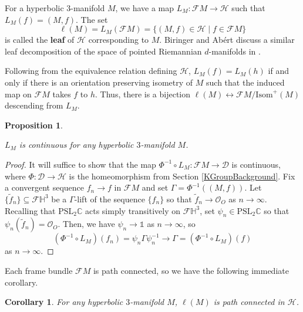 \documentclass[11pt,leqno]{article}
\newtheorem{prop}[lemma]{Proposition}
\newtheorem{cor}[lemma]{Corollary}
\theoremstyle{introdef}
\numberwithin{lemma}{section}
\theoremstyle{definition}
\newcommand{\C}{\mathbb{C}}
\begin{document}
For a hyperbolic $3$-manifold $M$, we have a map $L_M:\mathcal{F}M\rightarrow\mathcal{H}$ such that $L_M(f)=(M,f)$. The set \[\ell(M)=L_M(\mathcal{F}M)=\{(M,f)\in\mathcal{H}\;|\;f\in\mathcal{F}M\}\] is called the \textbf{leaf} of $\mathcal{H}$ corresponding to $M$. Biringer and Ab\'{e}rt discuss a similar leaf decomposition of the space of pointed Riemannian $d$-manifolds in \cite{IAN}. \par

Following from the equivalence relation defining $\mathcal{H}$, $L_M(f)=L_M(h)$ if and only if there is an orientation preserving isometry of $M$ such that the induced map on $\mathcal{F}M$ takes $f$ to $h$. Thus, there is a bijection $\ell(M)\leftrightarrow \mathcal{F}M/\mathrm{Isom}^+(M)$ descending from $L_M$.\par


\begin{prop}
\label{pathprop}

    $L_M$ is continuous for any hyperbolic $3$-manifold $M$.
    
\end{prop}



\begin{proof}
    It will suffice to show that the map $\Phi^{-1}\circ L_M:\mathcal{F}M\rightarrow\mathcal{D}$ is continuous, where $\Phi:\mathcal{D}\rightarrow\mathcal{H}$ is the homeomorphism from Section \ref{KGroupBackground}. Fix a convergent sequence $f_n\rightarrow f$ in $\mathcal{F}M$ and set $\Gamma=\Phi^{-1}((M,f))$. Let $\{\tilde{f}_n\}\subseteq\mathcal{F}\mathbb{H}^3$ be a $\Gamma$-lift of the sequence $\{f_n\}$ so that $\tilde{f}_n\rightarrow\mathcal{O}_O$ as $n\rightarrow\infty$. Recalling that $\mathrm{PSL}_2\C$ acts simply transitively on $\mathcal{F}\mathbb{H}^3$, set $\psi_n\in\mathrm{PSL}_2\C$ so that $\psi_n(\tilde{f}_n)=\mathcal{O}_O$. Then, we have $\psi_n\rightarrow\mathds{1}$ as $n\rightarrow\infty$, so \[(\Phi^{-1}\circ L_M)(f_n)=\psi_n\Gamma\psi_n^{-1}\rightarrow \Gamma = (\Phi^{-1}\circ L_M)(f)\] as $n\rightarrow\infty$.
\end{proof}


Each frame bundle $\mathcal{F}M$ is path connected, so we have the following immediate corollary. 

\begin{cor}
\label{leaf-pathcomp}
    For any hyperbolic $3$-manifold $M$, $\ell(M)$ is path connected in $\mathcal{H}$.
\end{cor}
\end{document}

